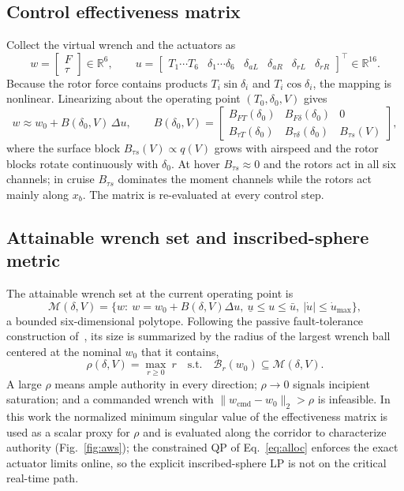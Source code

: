 \documentclass[preprint,3p,11pt]{elsarticle}
\begin{document}
\subsection{Control effectiveness matrix}\label{sec:Bmatrix}
Collect the virtual wrench and the actuators as
\begin{equation}
w=\begin{bmatrix}F\\ \tau\end{bmatrix}\in\mathbb{R}^{6},\qquad
u=\begin{bmatrix}T_1\!\cdots T_6&\delta_1\!\cdots\delta_6&\delta_{aL}&\delta_{aR}&\delta_{rL}&\delta_{rR}\end{bmatrix}^\top\in\mathbb{R}^{16}.
\label{eq:wu}
\end{equation}
Because the rotor force contains products $T_i\sin\delta_i$ and
$T_i\cos\delta_i$, the mapping is nonlinear. Linearizing about the operating
point $(T_0,\delta_0,V)$ gives
\begin{equation}
w \approx w_0 + B(\delta_0,V)\,\Delta u,\qquad
B(\delta_0,V)=\begin{bmatrix}
B_{FT}(\delta_0) & B_{F\delta}(\delta_0) & 0\\
B_{\tau T}(\delta_0) & B_{\tau\delta}(\delta_0) & B_{\tau s}(V)
\end{bmatrix},
\label{eq:B}
\end{equation}
where the surface block $B_{\tau s}(V)\propto q(V)$ grows with airspeed and the
rotor blocks rotate continuously with $\delta_0$. At hover $B_{\tau s}\approx0$
and the rotors act in all six channels; in cruise $B_{\tau s}$ dominates the
moment channels while the rotors act mainly along $x_b$. The matrix is
re-evaluated at every control step.

\subsection{Attainable wrench set and inscribed-sphere metric}\label{sec:awsmetric}
The attainable wrench set at the current operating point is
\begin{equation}
\mathcal{M}(\delta,V)=\bigl\{w:\ w=w_0+B(\delta,V)\Delta u,\
\underline u\le u\le\bar u,\ |\dot u|\le\dot u_{\max}\bigr\},
\label{eq:AWS}
\end{equation}
a bounded six-dimensional polytope. Following the passive fault-tolerance
construction of~\cite{yang2026biaxial}, its size is summarized by the radius
of the largest wrench ball centered at the nominal $w_0$ that it contains,
\begin{equation}
\rho(\delta,V)=\max_{r\ge0}\ r\quad\text{s.t.}\quad
\mathcal{B}_r(w_0)\subseteq\mathcal{M}(\delta,V).
\label{eq:rho}
\end{equation}
A large $\rho$ means ample authority in every direction; $\rho\to0$ signals
incipient saturation; and a commanded wrench with
$\|w_{\mathrm{cmd}}-w_0\|_2>\rho$ is infeasible. In this work the normalized
minimum singular value of the effectiveness matrix is used as a scalar proxy
for $\rho$ and is evaluated along the corridor to characterize authority
(Fig.~\ref{fig:aws}); the constrained QP of Eq.~\eqref{eq:alloc} enforces the
exact actuator limits online, so the explicit inscribed-sphere LP is not on
the critical real-time path.
\end{document}
